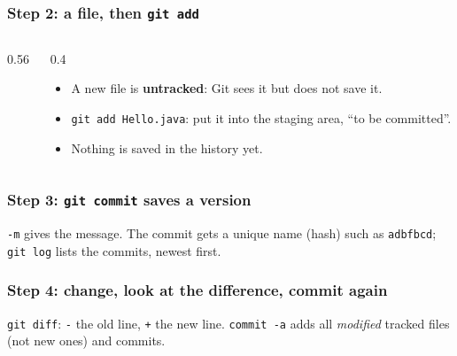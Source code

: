 \documentclass[aspectratio=169,10pt,compress]{beamer}
\begin{document}
\begin{frame}[t,fragile] \frametitle{Step 2: a file, then \texttt{git add}}
  \begin{columns}[T]
    \begin{column}{0.56\textwidth}
    \end{column}
    \begin{column}{0.4\textwidth}
      \begin{itemize}\small
        \item A new file is \textbf{untracked}: Git sees it but does not save it.
        \item \texttt{git add Hello.java}: put it into the staging area, ``to be committed''.
        \item Nothing is saved in the history yet.
      \end{itemize}
    \end{column}
  \end{columns}
\end{frame}




\begin{frame}[t,fragile] \frametitle{Step 3: \texttt{git commit} saves a version}

  \vspace{0.1em}
  \small
  \texttt{-m} gives the message. The commit gets a unique name (hash) such as \texttt{adbfbcd}; \texttt{git log} lists the commits, newest first.
\end{frame}




\begin{frame}[t,fragile] \frametitle{Step 4: change, look at the difference, commit again}

  \vspace{0.1em}
  \small
  \texttt{git diff}: \texttt{-} the old line, \texttt{+} the new line. \texttt{commit -a} adds all \emph{modified} tracked files (not new ones) and commits.
\end{frame}

\end{document}
